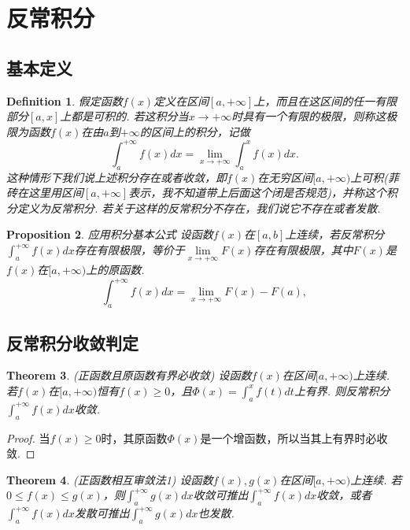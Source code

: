 \documentclass{article}
\newtheorem{theorem}{Theorem}[section]
\newtheorem{proposition}[theorem]{Proposition}
\newtheorem{definition}[theorem]{Definition}
\begin{document}
\newpage
\section{反常积分}

\subsection{基本定义}
\begin{definition}
\rm 假定函数$f(x)$定义在区间$[a,+\infty]$上，而且在这区间的任一有限部分$[a,x]$上都是可积的. 若这积分当$x \rightarrow +\infty$时具有一个有限的极限，则称这极限为函数$f(x)$在由$a$到$+\infty$的区间上的积分，记做
$$
\int_a^{+\infty} f(x)dx = \lim\limits_{x \rightarrow +\infty} \int_a^x f(x)dx.
$$
这种情形下我们说上述积分{\color{red}存在}或者{\color{red}收敛}，即$f(x)$在{\color{red}无穷区间}$[a,+\infty)$上可积({\color{red}菲砖在这里用区间$[a,+\infty]$表示，我不知道带上后面这个闭是否规范})，并称这个积分定义为{\color{red}反常积分}. 若关于这样的反常积分不存在，我们说它{\color{red}不存在}或者{\color{red}发散}.
\end{definition}

\begin{proposition}
\rm {\color{red} 应用积分基本公式} 设函数$f(x)$在$[a,b]$上连续，若反常积分$\int_a^{+\infty} f(x)dx$存在有限极限，等价于$\lim\limits_{x \rightarrow +\infty}F(x)$存在有限极限，其中$F(x)$是$f(x)$在$[a,+\infty)$上的原函数.
$$
\int_a^{+\infty} f(x)dx = \lim\limits_{x \rightarrow +\infty}F(x) - F(a),
$$ 
\end{proposition}

\subsection{反常积分收敛判定}

\begin{theorem}
\rm {\color{red} (正函数且原函数有界必收敛)} 设函数$f(x)$在区间$[a,+\infty)$上连续. 若$f(x)$在$[a,+\infty)$恒有$f(x)\geq 0$，且$\Phi(x) = \int_a^x f(t)dt$上有界. 则反常积分$\int_a^{+\infty} f(x)dx$收敛.
\end{theorem}

\begin{proof}
当$f(x)\geq 0$时，其原函数$\Phi(x)$是一个增函数，所以当其上有界时必收敛.
\end{proof}

\begin{theorem}
\rm {\color{red} (正函数相互审敛法1)} 设函数$f(x),g(x)$在区间$[a,+\infty)$上连续. 若$0 \leq f(x) \leq g(x)$，则$\int_a^{+\infty} g(x)dx$收敛可推出$\int_a^{+\infty} f(x)dx$收敛，或者$\int_a^{+\infty} f(x)dx$发散可推出$\int_a^{+\infty} g(x)dx$也发散.
\end{theorem}
\end{document}
